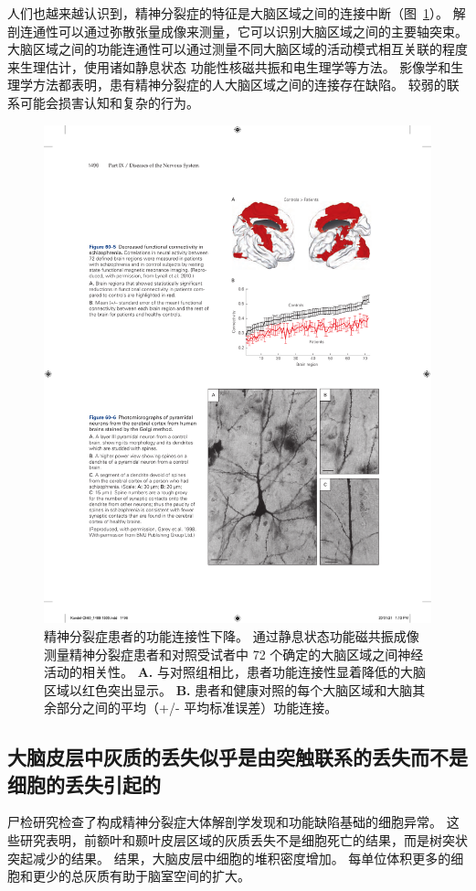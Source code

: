 人们也越来越认识到，精神分裂症的特征是大脑区域之间的连接中断（图~\ref{fig:60_5}）。
解剖连通性可以通过弥散张量成像来测量，它可以识别大脑区域之间的主要轴突束。
大脑区域之间的功能连通性可以通过测量不同大脑区域的活动模式相互关联的程度来生理估计，使用诸如静息状态 功能性核磁共振和电生理学等方法。
影像学和生理学方法都表明，患有精神分裂症的人大脑区域之间的连接存在缺陷。
较弱的联系可能会损害认知和复杂的行为。


\begin{figure}[htbp]
	\centering
	\includegraphics[width=0.6\linewidth]{chap60/fig_60_5}
	\caption{精神分裂症患者的功能连接性下降。
		通过静息状态功能磁共振成像测量精神分裂症患者和对照受试者中 72 个确定的大脑区域之间神经活动的相关性\cite{lynall2010functional}。
		\textbf{A.} 与对照组相比，患者功能连接性显着降低的大脑区域以红色突出显示。
		\textbf{B.} 患者和健康对照的每个大脑区域和大脑其余部分之间的平均（+/- 平均标准误差）功能连接。}
	\label{fig:60_5}
\end{figure}



\subsection{大脑皮层中灰质的丢失似乎是由突触联系的丢失而不是细胞的丢失引起的}

尸检研究检查了构成精神分裂症大体解剖学发现和功能缺陷基础的细胞异常。
这些研究表明，前额叶和颞叶皮层区域的灰质丢失不是细胞死亡的结果，而是树突状突起减少的结果。
结果，大脑皮层中细胞的堆积密度增加。
每单位体积更多的细胞和更少的总灰质有助于脑室空间的扩大。


